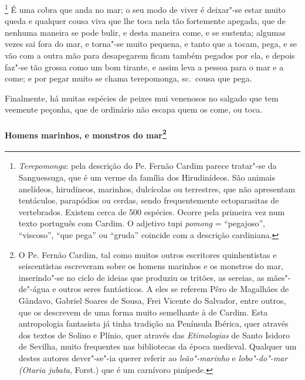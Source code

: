 \footnote{ \textit{Terepomonga}: pela descrição
do Pe. Fernão Cardim parece tratar"-se da Sanguessuga, que é um verme da
família dos Hirudinídeos. São animais anelídeos, hirudíneos, marinhos,
dulcícolas ou terrestres, que não apresentam tentáculos, parapódios ou
cerdas, sendo frequentemente ectoparasitas de vertebrados. Existem
cerca de 500 espécies. Ocorre pela primeira vez num texto português com
Cardim. O adjetivo tupi \textit{pomong} = ``pegajoso'', ``viscoso'', ``que
pega'' ou ``gruda'' coincide com a descrição cardiniana.} É uma
cobra que anda no mar; o seu modo de viver é deixar"-se estar muito
queda e qualquer cousa viva que lhe toca nela tão fortemente apegada,
que de nenhuma maneira se pode bulir, e desta maneira come, e se
sustenta; algumas vezes sai fora do mar, e torna"-se muito pequena, e
tanto que a tocam, pega, e se vão com a outra mão para desapegarem
ficam também pegados por ela, e depois faz"-se tão grossa como um bom
tirante, e assim leva a pessoa para o mar e a come; e por pegar muito
se chama terepomonga, sc.~cousa que pega. 

 Finalmente, há muitas espécies de peixes mui venenosos no salgado que
tem veemente peçonha, que de ordinário não escapa quem os come, ou toca.

\paragraph[Homens marinhos, e monstros do mar]{Homens marinhos, 
e monstros do mar\protect\footnote{ O Pe. Fernão
Cardim, tal como muitos outros escritores quinhentistas e seiscentistas
escreveram sobre os homens marinhos e os monstros do mar, inserindo"-se
no ciclo de ideias que produziu os tritões, as sereias, as mães"-de"-água
e outros seres fantásticos. A eles se referem Pêro de Magalhães de Gândavo,
Gabriel Soares de Sousa, Frei Vicente do Salvador, entre outros, que os
descrevem de uma forma muito semelhante à de Cardim. Esta antropologia
fantasista já tinha tradição na Península Ibérica, quer através dos
textos de Solino e Plínio, quer através das \textit{Etimologias} de
Santo Isidoro de Sevilha, muito frequentes nas bibliotecas da época
medieval. Qualquer um destes autores dever"-se"-ia querer referir ao
\textit{leão"-marinho} e \textit{lobo"-do"-mar (Otaria jubata}, Forst.)
que é um carnívoro pinípede.}}

